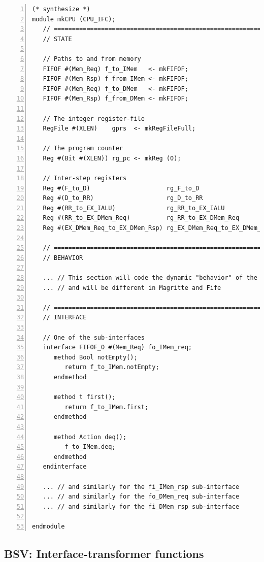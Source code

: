 \begin{Verbatim}[frame=single, numbers=left]
(* synthesize *)
module mkCPU (CPU_IFC);
   // ================================================================
   // STATE

   // Paths to and from memory
   FIFOF #(Mem_Req) f_to_IMem   <- mkFIFOF;
   FIFOF #(Mem_Rsp) f_from_IMem <- mkFIFOF;
   FIFOF #(Mem_Req) f_to_DMem   <- mkFIFOF;
   FIFOF #(Mem_Rsp) f_from_DMem <- mkFIFOF;

   // The integer register-file
   RegFile #(XLEN)    gprs  <- mkRegFileFull;

   // The program counter
   Reg #(Bit #(XLEN)) rg_pc <- mkReg (0);

   // Inter-step registers
   Reg #(F_to_D)                     rg_F_to_D                  <- mkRegU;
   Reg #(D_to_RR)                    rg_D_to_RR                 <- mkRegU;
   Reg #(RR_to_EX_IALU)              rg_RR_to_EX_IALU           <- mkRegU;
   Reg #(RR_to_EX_DMem_Req)          rg_RR_to_EX_DMem_Req       <- mkRegU;
   Reg #(EX_DMem_Req_to_EX_DMem_Rsp) rg_EX_DMem_Req_to_EX_DMem_Rsp <- mkRegU;

   // ================================================================
   // BEHAVIOR

   ... // This section will code the dynamic "behavior" of the module
   ... // and will be different in Magritte and Fife

   // ================================================================
   // INTERFACE

   // One of the sub-interfaces
   interface FIFOF_O #(Mem_Req) fo_IMem_req;
      method Bool notEmpty();
         return f_to_IMem.notEmpty;
      endmethod

      method t first();
         return f_to_IMem.first;
      endmethod

      method Action deq();
         f_to_IMem.deq;
      endmethod
   endinterface

   ... // and similarly for the fi_IMem_rsp sub-interface
   ... // and similarly for the fo_DMem_req sub-interface
   ... // and similarly for the fi_DMem_rsp sub-interface

endmodule

\end{Verbatim}


\subsection{BSV: Interface-transformer functions}

